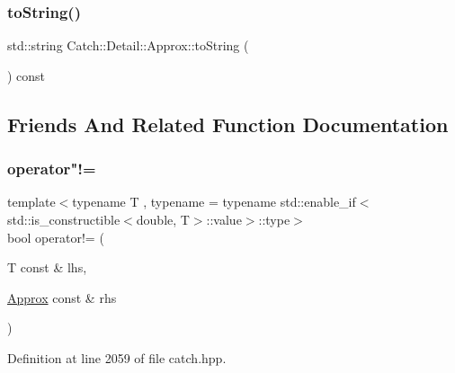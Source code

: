 \subsubsection{\texorpdfstring{to\+String()}{toString()}}
{\footnotesize\ttfamily std\+::string Catch\+::\+Detail\+::\+Approx\+::to\+String (\begin{DoxyParamCaption}{ }\end{DoxyParamCaption}) const}



\subsection{Friends And Related Function Documentation}
\mbox{\label{class_catch_1_1_detail_1_1_approx_a29696f14ebd51887c8c88e771d12ef54}} 
\subsubsection{\texorpdfstring{operator"!=}{operator!=}\hspace{0.1cm}{\footnotesize\ttfamily [1/2]}}
{\footnotesize\ttfamily template$<$typename T , typename  = typename std\+::enable\+\_\+if$<$std\+::is\+\_\+constructible$<$double, T$>$\+::value$>$\+::type$>$ \\
bool operator!= (\begin{DoxyParamCaption}\item[{T const \&}]{lhs,  }\item[{\mbox{\hyperlink{class_catch_1_1_detail_1_1_approx}{Approx}} const \&}]{rhs }\end{DoxyParamCaption})\hspace{0.3cm}{\ttfamily [friend]}}



Definition at line 2059 of file catch.\+hpp.

\mbox{\label{class_catch_1_1_detail_1_1_approx_a31d62e3c35abb86cf25e02601966ca5d}} 
